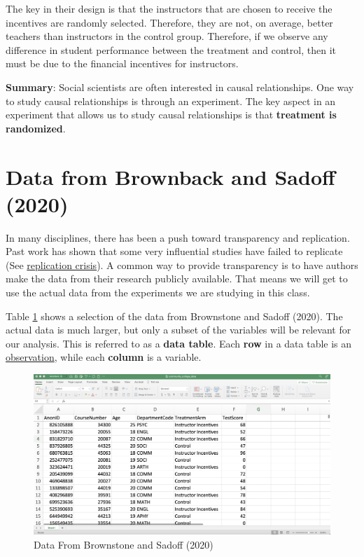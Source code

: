 \documentclass[
]{book}
\begin{document}
The key in their design is that the instructors that are chosen to receive the incentives are randomly selected. Therefore, they are not, on average, better teachers than instructors in the control group. Therefore, if we observe any difference in student performance between the treatment and control, then it must be due to the financial incentives for instructors.

\textbf{Summary}: Social scientists are often interested in causal relationships. One way to study causal relationships is through an experiment. The key aspect in an experiment that allows us to study causal relationships is that \textbf{treatment is randomized}.

\hypertarget{data-from-brownback-and-sadoff-2020}{%
\section{Data from Brownback and Sadoff (2020)}\label{data-from-brownback-and-sadoff-2020}}

In many disciplines, there has been a push toward transparency and replication. Past work has shown that some very influential studies have failed to replicate (See \href{https://en.wikipedia.org/wiki/Replication_crisis\#In_economics}{replication crisis}). A common way to provide transparency is to have authors make the data from their research publicly available. That means we will get to use the actual data from the experiments we are studying in this class.

Table \ref{fig:bsdata} shows a selection of the data from Brownstone and Sadoff (2020). The actual data is much larger, but only a subset of the variables will be relevant for our analysis. This is referred to as a \textbf{data table}. Each \textbf{row} in a data table is an \underline{observation}, while each \textbf{column} is a variable.

\begin{figure}

{\centering \includegraphics[width=0.75\linewidth]{images/01_data} 

}

\caption{Data From Brownstone and Sadoff (2020)}\label{fig:bsdata}
\end{figure}
\end{document}
